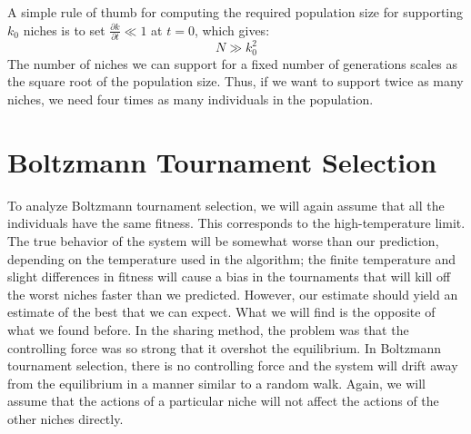 A simple rule of thumb for computing the required population size for 
supporting $k_0$ niches is to set $\frac{\partial k}{\partial t} \ll 1$
at $t=0$, which gives:
\begin{equation}
N \gg k_0^2
\end{equation}
The number of niches we can support for a fixed number of generations
scales as the square root of the population size.  Thus, if we want
to support twice as many niches, we need four times as many individuals in
the population.

\section{Boltzmann Tournament Selection}
To analyze Boltzmann tournament selection, we will again assume that
all the individuals have the same fitness.  This corresponds to the
high-temperature limit.  The true behavior of the system will be somewhat
worse than our prediction, depending on the temperature used in the
algorithm; the finite temperature and slight differences in fitness
will cause a bias in the tournaments that will kill off the worst niches
faster than we predicted.  However, our estimate should yield an estimate
of the best that we can expect.  What we will find is the opposite of
what we found before.  In the sharing method, the problem was that the
controlling force was so strong that it overshot the equilibrium.  In
Boltzmann tournament selection, there is no controlling force and the
system will drift away from the equilibrium in a manner similar to
a random walk.   Again, we will assume that the actions of a particular
niche will not affect the actions of the other niches directly.

